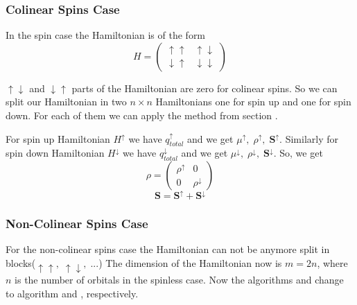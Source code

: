 \subsubsection{Colinear Spins Case}
\par{In the spin case the Hamiltonian is of the form}
\begin{equation}
\label{spinH}
H=\left(
\begin{array}{c|c}
\uparrow \uparrow & \uparrow \downarrow \\
\hline
\downarrow \uparrow & \downarrow \downarrow
\end{array}
\right)
\end{equation}
\par{$\uparrow \downarrow$ and $\downarrow \uparrow$ parts of the Hamiltonian are
zero for colinear spins. So we can split our Hamiltonian in two $n \times n$
Hamiltonians one for spin up and one for spin down. For each of them we can apply
the method from section }.
\par{For spin up Hamiltonian $H^{\uparrow}$ we have $q_{total}^{\uparrow}$ and we get
$\mu^{\uparrow},\;\rho^{\uparrow},\;\bm{S}^{\uparrow}$. Similarly for spin down Hamiltonian $H^{\downarrow}$
we have $q_{total}^{\downarrow}$ and we get
$\mu^{\downarrow},\;\rho^{\downarrow},\;\bm{S}^{\downarrow}$. So, we get}
\begin{equation}
\rho=\left(
\begin{array}{c|c}
\rho^{\uparrow} & 0 \\
\hline
0 & \rho^{\downarrow}
\end{array}
\right)
\end{equation}
\begin{equation}
\bm{S}=\bm{S^{\uparrow}}+\bm{S^{\downarrow}}
\end{equation}
\subsubsection{Non-Colinear Spins Case}
\par{For the non-colinear spins case the Hamiltonian  can not be anymore split in blocks($\uparrow \uparrow,\;\uparrow \downarrow,\;...$)
The dimension of the Hamiltonian now is $m=2n$, where $n$ is the number of orbitals
in the spinless case. Now the algorithms  and  change
to algorithm  and , respectively.}


